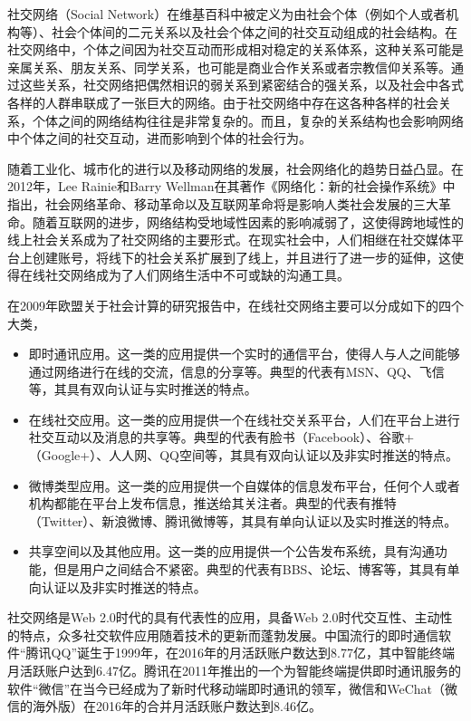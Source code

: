 社交网络（Social Network）在维基百科中被定义为由社会个体（例如个人或者机构等）、社会个体间的二元关系以及社会个体之间的社交互动组成的社会结构。在社交网络中，个体之间因为社交互动而形成相对稳定的关系体系，这种关系可能是亲属关系、朋友关系、同学关系，也可能是商业合作关系或者宗教信仰关系等。通过这些关系，社交网络把偶然相识的弱关系到紧密结合的强关系，以及社会中各式各样的人群串联成了一张巨大的网络。由于社交网络中存在这各种各样的社会关系，个体之间的网络结构往往是非常复杂的。而且，复杂的关系结构也会影响网络中个体之间的社交互动，进而影响到个体的社会行为。

随着工业化、城市化的进行以及移动网络的发展，社会网络化的趋势日益凸显。在2012年，Lee Rainie和Barry Wellman在其著作《网络化：新的社会操作系统》中指出，社会网络革命、移动革命以及互联网革命将是影响人类社会发展的三大革命。随着互联网的进步，网络结构受地域性因素的影响减弱了，这使得跨地域性的线上社会关系成为了社交网络的主要形式。在现实社会中，人们相继在社交媒体平台上创建账号，将线下的社会关系扩展到了线上，并且进行了进一步的延伸，这使得在线社交网络成为了人们网络生活中不可或缺的沟通工具。

在2009年欧盟关于社会计算的研究报告中，在线社交网络主要可以分成如下的四个大类，
\begin{itemize}
	\item 即时通讯应用。这一类的应用提供一个实时的通信平台，使得人与人之间能够通过网络进行在线的交流，信息的分享等。典型的代表有MSN、QQ、飞信等，其具有双向认证与实时推送的特点。
	\item 在线社交应用。这一类的应用提供一个在线社交关系平台，人们在平台上进行社交互动以及消息的共享等。典型的代表有脸书（Facebook）、谷歌+（Google+）、人人网、QQ空间等，其具有双向认证以及非实时推送的特点。
	\item 微博类型应用。这一类的应用提供一个自媒体的信息发布平台，任何个人或者机构都能在平台上发布信息，推送给其关注者。典型的代表有推特（Twitter）、新浪微博、腾讯微博等，其具有单向认证以及实时推送的特点。
	\item 共享空间以及其他应用。这一类的应用提供一个公告发布系统，具有沟通功能，但是用户之间结合不紧密。典型的代表有BBS、论坛、博客等，其具有单向认证以及非实时推送的特点。
\end{itemize}

社交网络是Web 2.0时代的具有代表性的应用，具备Web 2.0时代交互性、主动性的特点，众多社交软件应用随着技术的更新而蓬勃发展。中国流行的即时通信软件“腾讯QQ”诞生于1999年，在2016年的月活跃账户数达到8.77亿，其中智能终端月活跃账户达到6.47亿。腾讯在2011年推出的一个为智能终端提供即时通讯服务的软件“微信”在当今已经成为了新时代移动端即时通讯的领军，微信和WeChat（微信的海外版）在2016年的合并月活跃账户数达到8.46亿。
